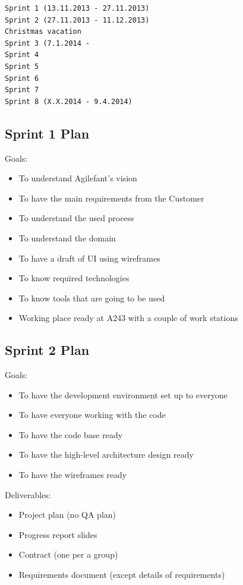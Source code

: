 \begin{verbatim}
Sprint 1 (13.11.2013 - 27.11.2013)
Sprint 2 (27.11.2013 - 11.12.2013)
Christmas vacation
Sprint 3 (7.1.2014 - 
Sprint 4
Sprint 5
Sprint 6
Sprint 7
Sprint 8 (X.X.2014 - 9.4.2014) 
\end{verbatim}

\subsection{Sprint 1 Plan}

Goals:
\begin{itemize}
\item To understand Agilefant's vision
\item To have the main requirements from the Customer
\item To understand the used process
\item To understand the domain
\item To have a draft of UI using wireframes
\item To know required technologies
\item To know tools that are going to be used
\item Working place ready at A243 with a couple of work stations
\end{itemize}

\subsection{Sprint 2 Plan}

Goals:
\begin{itemize}
\item To have the development environment set up to everyone
\item To have everyone working with the code 
\item To have the code base ready 
\item To have the high-level architecture design ready
\item To have the wireframes ready
\end{itemize}

\noindent Deliverables:
\begin{itemize}
\item Project plan (no QA plan)
\item Progress report slides
\item Contract (one per a group)
\item Requirements document (except details of requirements)
\end{itemize}

